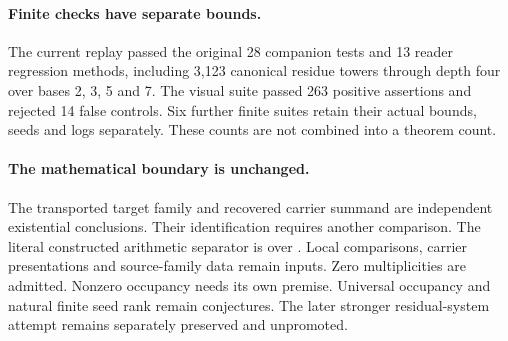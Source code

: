 \paragraph{Finite checks have separate bounds.}
The current replay passed the original 28 companion tests and 13 reader
regression methods, including 3,123 canonical residue towers through depth four
over bases 2, 3, 5 and 7. The visual suite passed 263 positive assertions and
rejected 14 false controls. Six further finite suites retain their actual bounds,
seeds and logs separately. These counts are not combined into a theorem count.

\paragraph{The mathematical boundary is unchanged.}
The transported target family and recovered carrier summand are independent
existential conclusions. Their identification requires another comparison.
The literal constructed arithmetic separator is over . Local
comparisons, carrier presentations and source-family data remain inputs.
Zero multiplicities are admitted. Nonzero occupancy needs its own premise.
Universal occupancy and natural finite seed rank remain conjectures. The later
stronger residual-system attempt remains separately preserved and unpromoted.
\clearpage
